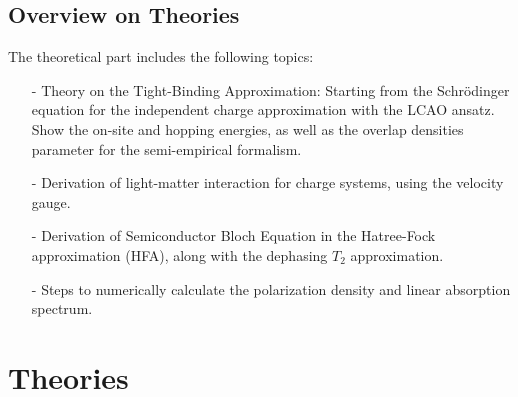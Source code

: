 \documentclass[12pt,english,a4paper]{article}
\begin{document}
	\subsection{Overview on Theories}
	\quad The theoretical part includes the following topics:
	\begin{itemize}
	\item[-] Theory on the Tight-Binding Approximation: Starting from the Schrödinger equation for the independent charge approximation with the LCAO ansatz. Show the on-site and hopping energies, as well as the overlap densities parameter for the semi-empirical formalism. 
	\item[-] Derivation of light-matter interaction for charge systems, using the velocity gauge. 
	\item[-] Derivation of Semiconductor Bloch Equation in the Hatree-Fock approximation (HFA), along with the dephasing $T_2$ approximation. 
	\item[-] Steps to numerically calculate the polarization density and linear absorption spectrum.
	\end{itemize}
	\newpage
	\section{Theories}
\end{document}
